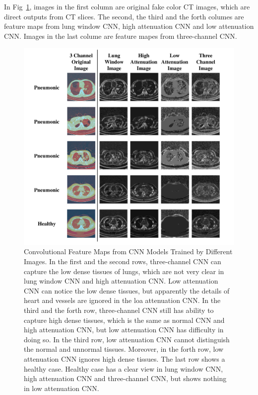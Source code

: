 \documentclass[journal]{IEEEtran}
\begin{document}
In Fig~\ref{show}, images in the first column are original fake color CT images, which are direct outputs from CT slices. The second, the third and the forth columes are feature maps from lung window CNN, high attenuation CNN and low attenuation CNN. Images in the last colume are feature mapes from three-channel CNN.

\begin{figure}[t]
    \centerline{\includegraphics[width=180mm]{show.pdf}}
    \vspace{-0cm}
    \caption{Convolutional Feature Maps from CNN Models Trained by Different Images. In the first and the second rows, three-channel CNN can capture the low dense tissues of lungs, which are not very clear in lung window CNN and high attenuation CNN. Low attenuation CNN can notice the low dense tissues, but apparently the details of heart and vessels are ignored in the loa attenuation CNN. 
    In the third and the forth row, three-channel CNN still has ability to capture high dense tissues, which is the same as normal CNN and high attenuation CNN, but low attenuation CNN has difficulty in doing so. In the third row, low attenuation CNN cannot distinguish the normal and unnormal tissues. Moreover, in the forth row, low attenuation CNN ignores high dense tissues. The last row shows a healthy case. Healthy case has a clear view in lung window CNN, high attenuation CNN and three-channel CNN, but shows nothing in low attenuation CNN.}
    \vspace{-0cm}
    \label{show}
    \end{figure}
\end{document}
